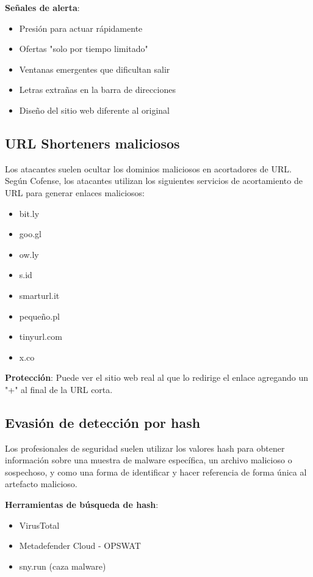 \textbf{Señales de alerta}:
\begin{itemize}
    \item Presión para actuar rápidamente
    \item Ofertas "solo por tiempo limitado"
    \item Ventanas emergentes que dificultan salir
    \item Letras extrañas en la barra de direcciones
    \item Diseño del sitio web diferente al original
\end{itemize}

\subsection{URL Shorteners maliciosos}

Los atacantes suelen ocultar los dominios maliciosos en acortadores de URL. Según Cofense, los atacantes utilizan los siguientes servicios de acortamiento de URL para generar enlaces maliciosos:

\begin{itemize}
    \item bit.ly
    \item goo.gl
    \item ow.ly
    \item s.id
    \item smarturl.it
    \item pequeño.pl
    \item tinyurl.com
    \item x.co
\end{itemize}

\textbf{Protección}: Puede ver el sitio web real al que lo redirige el enlace agregando un "+" al final de la URL corta.

\subsection{Evasión de detección por hash}

Los profesionales de seguridad suelen utilizar los valores hash para obtener información sobre una muestra de malware específica, un archivo malicioso o sospechoso, y como una forma de identificar y hacer referencia de forma única al artefacto malicioso.

\textbf{Herramientas de búsqueda de hash}:
\begin{itemize}
    \item VirusTotal
    \item Metadefender Cloud - OPSWAT
    \item sny.run (caza malware)
\end{itemize}

